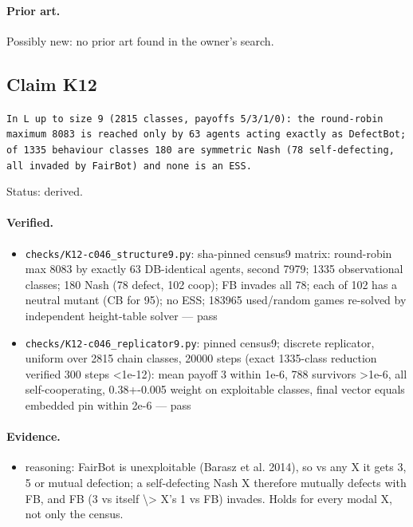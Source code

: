 \documentclass{article}
\begin{document}
\paragraph{Prior art.} Possibly new: no prior art found in the owner's search.

\subsection*{Claim K12}

\texttt{In L up to size 9 (2815 classes, payoffs 5/3/1/0): the round-robin maximum 8083 is reached only by 63 agents acting exactly as DefectBot; of 1335 behaviour classes 180 are symmetric Nash (78 self-defecting, all invaded by FairBot) and none is an ESS.}

Status: derived.

\paragraph{Verified.}
\begin{itemize}
\item \texttt{checks/K12-c046\_structure9.py}: sha-pinned census9 matrix: round-robin max 8083 by exactly 63 DB-identical agents, second 7979; 1335 observational classes; 180 Nash (78 defect, 102 coop); FB invades all 78; each of 102 has a neutral mutant (CB for 95); no ESS; 183965 used/random games re-solved by independent height-table solver --- pass
\item \texttt{checks/K12-c046\_replicator9.py}: pinned census9; discrete replicator, uniform over 2815 chain classes, 20000 steps (exact 1335-class reduction verified 300 steps \textless{}1e-12): mean payoff 3 within 1e-6, 788 survivors \textgreater{}1e-6, all self-cooperating, 0.38+-0.005 weight on exploitable classes, final vector equals embedded pin within 2e-6 --- pass
\end{itemize}

\paragraph{Evidence.}
\begin{itemize}
\item reasoning: FairBot is unexploitable (Barasz et al. 2014), so vs any X it gets 3, 5 or mutual defection; a self-defecting Nash X therefore mutually defects with FB, and FB (3 vs itself \textbackslash{}\textgreater{} X's 1 vs FB) invades. Holds for every modal X, not only the census.
\end{itemize}
\end{document}
